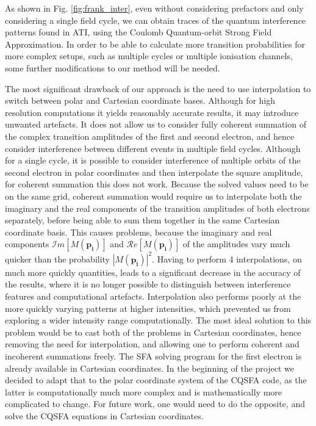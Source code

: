 \documentclass[11pt]{article}
\numberwithin{equation}{section}
\begin{document}
As shown in Fig. \ref{fig:frank_inter}, even without considering prefactors and only considering a single field cycle, we can obtain traces of the quantum interference patterns found in ATI, using the Coulomb Quantum-orbit Strong Field Approximation. In order to be able to calculate more transition probabilities for more complex setups, such as multiple cycles or multiple ionisation channels, some further modifications to our method will be needed. 
\par
The most significant drawback of our approach is the need to use interpolation to switch between polar and Cartesian coordinate bases. Although for high resolution computations it yields reasonably accurate results, it may introduce unwanted artefacts. It does not allow us to consider fully coherent summation of the complex transition amplitudes of the first and second electron, and hence consider interference between different events in multiple field cycles. Although for a single cycle, it is possible to consider interference of multiple orbits of the second electron in polar coordinates and then interpolate the square amplitude, for coherent summation this does not work. Because the solved values need to be on the same grid, coherent summation would require us to interpolate both the imaginary and the real components of the transition amplitudes of both electrons separately, before being able to sum them together in the same Cartesian coordinate basis. This causes problems, because the imaginary and real components $\mathcal{I}m[M(\mathbf{p_i})]$ and $\mathcal{R}e[M(\mathbf{p_i})]$ of the amplitudes vary much quicker than the probability $\left | M(\mathbf{p_i}) \right |^2$. Having to perform 4 interpolations, on much more quickly quantities, leads to a significant decrease in the accuracy of the results, where it is no longer possible to distinguish between interference features and computational artefacts. Interpolation also performs poorly at the more quickly varying patterns at higher intensities, which prevented us from exploring a wider intensity range computationally.
\newline
The most ideal solution to this problem would be to cast both of the problems in Cartesian coordinates, hence removing the need for interpolation, and allowing one to perform coherent and incoherent summations freely. The SFA solving program for the first electron is already available in Cartesian coordinates. In the beginning of the project we decided to adapt that to the polar coordinate system of the CQSFA code, as the latter is computationally much more complex and is mathematically more complicated to change. For future work, one would need to do the opposite, and solve the CQSFA equations in Cartesian coordinates.
\end{document}
